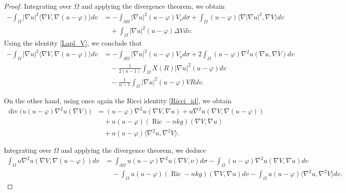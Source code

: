 \documentclass[reqno,11pt]{amsart}
\numberwithin{equation}{section}  %
\begin{document}
\begin{proof}
Integrating over \(\Omega\) and applying the divergence theorem, we obtain
\begin{align}\label{eqaux0}
-\int_{\Omega}|\nabla u|^{2}\langle\nabla V,\nabla(u-\varphi)\rangle dv
&=
-\int_{\partial\Omega}|\nabla u|^{2}(u-\varphi)V_{\nu} d\sigma
+
\int_{\Omega}(u-\varphi)\langle\nabla |\nabla u|^{2},\nabla V\rangle dv
\nonumber\\
&\quad
+
\int_{\Omega}|\nabla u|^{2}(u-\varphi)\Delta V dv.
\end{align}
Using the identity \eqref{Lapl_V}, we conclude that
\begin{align}\label{eqaux0_final}
-\int_{\Omega}|\nabla u|^{2}\langle\nabla V,\nabla(u-\varphi)\rangle dv
&=
-\int_{\partial\Omega}|\nabla u|^{2}(u-\varphi)V_{\nu} d\sigma
+
2\int_{\Omega}(u-\varphi)\nabla^2 u(\nabla u,\nabla V) dv
\nonumber\\
&\quad
-
\frac{1}{2(n-1)}
\int_{\Omega}X(R)|\nabla u|^{2}(u-\varphi)dv
\nonumber\\
&\quad
-
\frac{1}{n-1}
\int_{\Omega}|\nabla u|^{2}(u-\varphi)VR dv.
\end{align}

On the other hand, using once again the Ricci identity \eqref{Ricci_id}, we obtain
\begin{align*}
\operatorname{div}\bigl(u(u-\varphi)\nabla^{2}u(\nabla V)\bigr)
&=
(u-\varphi)\nabla^{2}u(\nabla V,\nabla u)
+
u\nabla^{2}u(\nabla V,\nabla(u-\varphi))
\nonumber\\
&\quad
+
u(u-\varphi)(\operatorname{Ric}-nkg)(\nabla V,\nabla u)
\nonumber\\
&\quad
+
u(u-\varphi)\langle\nabla^{2}u,\nabla^{2}V\rangle.
\end{align*}

Integrating over \(\Omega\) and applying the divergence theorem, we deduce
\begin{align}\label{auxeq1}
\int_{\Omega}u\nabla^{2}u(\nabla V,\nabla(u-\varphi)) dv
&=
\int_{\partial\Omega}u(u-\varphi)\nabla^{2}u(\nabla V,\nu)d\sigma
-
\int_{\Omega}(u-\varphi)\nabla^{2}u(\nabla V,\nabla u)dv
\nonumber\\
&\quad
-
\int_{\Omega}u(u-\varphi)(\operatorname{Ric}-nkg)(\nabla V,\nabla u)dv
-
\int_{\Omega}u(u-\varphi)\langle\nabla^{2}u,\nabla^{2}V\rangle dv.
\end{align}


\end{proof}
\end{document}

